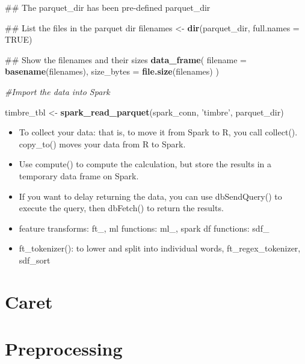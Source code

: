 \documentclass[]{book}
\newenvironment{Shaded}{\begin{snugshade}}{\end{snugshade}}
\newcommand{\KeywordTok}[1]{\textcolor[rgb]{0.13,0.29,0.53}{\textbf{#1}}}
\newcommand{\DataTypeTok}[1]{\textcolor[rgb]{0.13,0.29,0.53}{#1}}
\newcommand{\StringTok}[1]{\textcolor[rgb]{0.31,0.60,0.02}{#1}}
\newcommand{\CommentTok}[1]{\textcolor[rgb]{0.56,0.35,0.01}{\textit{#1}}}
\newcommand{\OtherTok}[1]{\textcolor[rgb]{0.56,0.35,0.01}{#1}}
\newcommand{\NormalTok}[1]{#1}
\theoremstyle{definition}
\theoremstyle{definition}
\theoremstyle{definition}
\theoremstyle{remark}
\begin{document}
\begin{Shaded}
\begin{Highlighting}[]
\NormalTok{## The parquet_dir has been pre-defined}
\NormalTok{parquet_dir}

\NormalTok{## List the files in the parquet dir}
\NormalTok{filenames <-}\StringTok{ }\KeywordTok{dir}\NormalTok{(parquet_dir, }\DataTypeTok{full.names =} \OtherTok{TRUE}\NormalTok{)}

\NormalTok{## Show the filenames and their sizes}
\KeywordTok{data_frame}\NormalTok{(}
  \DataTypeTok{filename =} \KeywordTok{basename}\NormalTok{(filenames),}
  \DataTypeTok{size_bytes =} \KeywordTok{file.size}\NormalTok{(filenames)}
\NormalTok{)}

\CommentTok{#Import the data into Spark}

\NormalTok{timbre_tbl <-}\StringTok{ }\KeywordTok{spark_read_parquet}\NormalTok{(spark_conn, }\StringTok{'timbre'}\NormalTok{, parquet_dir)}
\end{Highlighting}
\end{Shaded}

\begin{itemize}
\item
  To collect your data: that is, to move it from Spark to R, you call
  collect(). copy\_to() moves your data from R to Spark.
\item
  Use compute() to compute the calculation, but store the results in a
  temporary data frame on Spark.
\item
  If you want to delay returning the data, you can use dbSendQuery() to
  execute the query, then dbFetch() to return the results.
\item
  feature transforms: ft\_, ml functions: ml\_, spark df functions:
  sdf\_
\item
  ft\_tokenizer(): to lower and split into individual words,
  ft\_regex\_tokenizer, sdf\_sort
\end{itemize}

\section{Caret}\label{caret}

\section{Preprocessing}\label{preprocessing}
\end{document}
